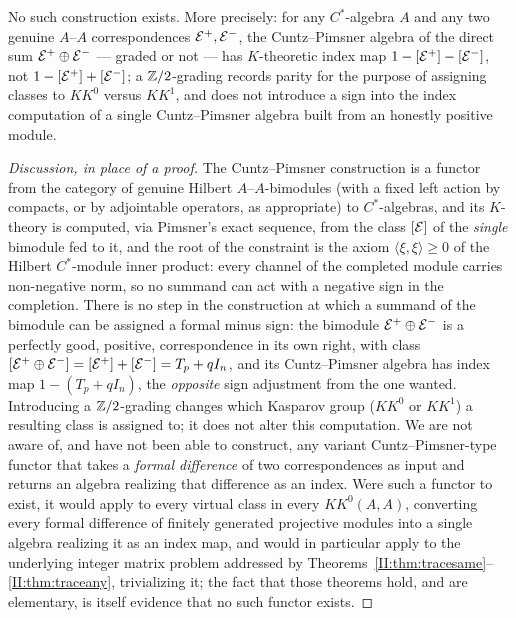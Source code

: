 \begin{proposition}\label{II:prop:nograding}
No such construction exists. More precisely: for any $C^*$-algebra $A$ and any two
genuine $A$--$A$ correspondences $\mathcal{E}^+,\mathcal{E}^-$, the Cuntz--Pimsner algebra of the direct
sum $\mathcal{E}^+\oplus\mathcal{E}^-$ --- graded or not --- has $K$-theoretic index map
$1-[\mathcal{E}^+]-[\mathcal{E}^-]$, not $1-[\mathcal{E}^+]+[\mathcal{E}^-]$; a $\mathbb{Z}/2$-grading records parity for the
purpose of assigning classes to $KK^0$ versus $KK^1$, and does not introduce a sign into
the index computation of a single Cuntz--Pimsner algebra built from an honestly positive
module.
\end{proposition}

\begin{proof}[Discussion, in place of a proof]
The Cuntz--Pimsner construction is a functor from the category of genuine Hilbert
$A$--$A$-bimodules (with a fixed left action by compacts, or by adjointable operators, as
appropriate) to $C^*$-algebras, and its $K$-theory is computed, via Pimsner's exact
sequence, from the class $[\mathcal{E}]$ of the \emph{single} bimodule fed to it, and the root
of the constraint is the axiom $\langle\xi,\xi\rangle\ge0$ of the Hilbert $C^*$-module
inner product: every channel of the completed module carries non-negative norm, so no
summand can act with a negative sign in the completion. There is no step in the
construction at which a summand of the bimodule can be assigned a formal minus sign: the bimodule $\mathcal{E}^+\oplus\mathcal{E}^-$ is a perfectly good, positive, correspondence
in its own right, with class $[\mathcal{E}^+\oplus\mathcal{E}^-]=[\mathcal{E}^+]+[\mathcal{E}^-]=T_p+qI_n$, and its
Cuntz--Pimsner algebra has index map $1-(T_p+qI_n)$, the \emph{opposite} sign
adjustment from the one wanted. Introducing a $\mathbb{Z}/2$-grading changes which Kasparov
group ($KK^0$ or $KK^1$) a resulting class is assigned to; it does not alter this
computation. We are not aware of, and have not been able to construct, any variant
Cuntz--Pimsner-type functor that takes a \emph{formal difference} of two correspondences
as input and returns an algebra realizing that difference as an index. Were such a
functor to exist, it would apply to every virtual class in every $KK^0(A,A)$, converting
every formal difference of finitely generated projective modules into a single algebra
realizing it as an index map, and would in particular apply to the underlying integer
matrix problem addressed by Theorems~\ref{II:thm:tracesame}--\ref{II:thm:traceany}, trivializing
it; the fact that those theorems hold, and are elementary, is itself evidence that no
such functor exists.
\end{proof}

